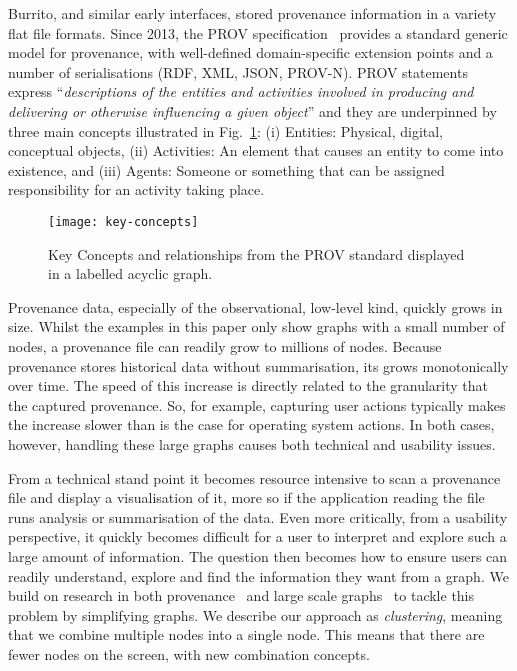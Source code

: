 Burrito, and similar early interfaces, stored provenance information in a variety flat file formats. Since 2013, the PROV specification~\cite{primer2013} provides a standard generic model for provenance, with well-defined domain-specific extension points and a number of serialisations (RDF, XML, JSON, PROV-N).
%
PROV statements express ``\emph{descriptions of the entities and activities involved in producing and delivering or otherwise influencing a given object}'' and they are underpinned by three main concepts illustrated in Fig.~\ref{fig:key-concepts}:
(i) Entities: Physical, digital, conceptual objects, (ii) Activities: An element that causes an entity to come into existence, and (iii) Agents: Someone or something that can be assigned responsibility for an activity taking place.

\begin{figure}[h]
	\centering
	\texttt{[image: key-concepts]}
	\caption{Key Concepts and relationships from the PROV standard displayed in a labelled acyclic graph.}
	\label{fig:key-concepts}
\end{figure}

Provenance data, especially of the observational, low-level kind, quickly grows in size. Whilst the examples in this paper only show graphs with a small number of nodes, a provenance file can readily grow to millions of nodes. Because provenance stores historical data without summarisation, its grows monotonically over time. The speed of this increase is directly related to the granularity that the captured provenance. So, for example, capturing user actions typically makes the increase slower than is the case for operating system actions. In both cases, however, handling these large graphs causes both technical and usability issues. 

From a technical stand point it becomes resource intensive to scan a provenance file and display a visualisation of it, more so if the application reading the file runs analysis or summarisation of the data. 
%
Even more critically, from a usability perspective, it quickly becomes difficult for a user to interpret and explore such a large amount of information. The question then becomes how to ensure 
users can readily understand, explore and find the information they want from a graph. 
We build on research in both provenance~\cite{Seltzer2011, Borkin2013} 
and large scale graphs~\cite{Schaffer1996, Abello2006} 
to tackle this problem by simplifying graphs.
We describe our approach as \emph{clustering}, meaning that we combine multiple nodes into a single node.
This means that there are fewer nodes on the screen, with new combination concepts.

